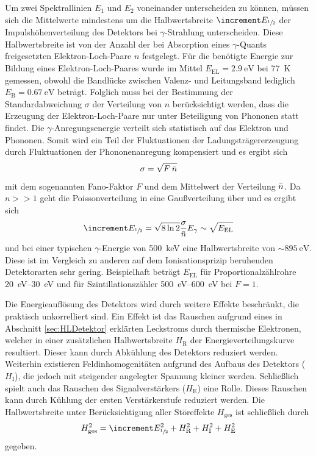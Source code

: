 Um zwei Spektrallinien $E_1$ und $E_2$ voneinander unterscheiden zu können, müssen
sich die Mittelwerte mindestens um die Halbwertsbreite $\increment E_{\sfrac{1}{2}}$
der Impulshöhenverteilung des Detektors bei $\gamma$-Strahlung unterscheiden.
Diese Halbwertsbreite ist von der Anzahl der bei Absorption eines $\gamma$-Quants
freigesetzten Elektron-Loch-Paare $n$ festgelegt.
Für die benötigte Energie zur Bildung eines Elektron-Loch-Paares wurde im Mittel
$E_\text{EL} = \SI{2.9}{\electronvolt}$ bei \SI{77}{\kelvin} gemessen,
obwohl die Bandlücke zwischen Valenz- und Leitungsband lediglich
$E_\text{B} = \SI{0.67}{\electronvolt}$ beträgt.
Folglich muss bei der Bestimmung der Standardabweichung $\sigma$ der Verteilung von $n$ berücksichtigt werden, dass die
Erzeugung der Elektron-Loch-Paare nur unter Beteiligung von Phononen statt findet.
Die $\gamma$-Anregungsenergie verteilt sich statistisch auf das Elektron und Phononen.
Somit wird ein Teil der Fluktuationen der Ladungsträgererzeugung durch Fluktuationen der
Phononenanregung kompensiert und es ergibt sich
\begin{equation}
	\sigma = \sqrt{F\:\bar{n}}
\end{equation}
mit dem sogenannten Fano-Faktor $F$ und dem Mittelwert der Verteilung $\bar{n}$.
Da $n >> 1$ geht die Poissonverteilung in eine Gaußverteilung über und es ergibt sich
\begin{equation}
	\increment E_{\sfrac{1}{2}} = \sqrt{8 \ln2} \frac{\sigma}{\mean{n}} E_\gamma
  \sim \sqrt{E_\text{EL}}
\end{equation}
und bei einer typischen $\gamma$-Energie von \SI{500}{\kilo\electronvolt} eine
Halbwertsbreite von $\sim \SI{895}{\electronvolt}$.
Diese ist im Vergleich zu anderen auf dem Ionisationsprizip beruhenden
Detektorarten sehr gering.
Beispielhaft beträgt $E_\text{EL}$ für Proportionalzählrohre
\SIrange[range-phrase=\text{ bis }]{20}{30}{\electronvolt} und für Szintillationszähler
\SIrange[range-phrase=\text{ bis }]{500}{600}{\electronvolt} bei $F = \num{1}$.

Die Energieauflösung des Detektors wird durch weitere Effekte beschränkt, die praktisch unkorrelliert sind.
Ein Effekt ist das Rauschen aufgrund eines in Abschnitt \ref{sec:HLDetektor} erklärten Leckstroms
durch thermische Elektronen, welcher in einer zusätzlichen Halbwertsbreite $H_\text{R}$ der Energieverteilungskurve resultiert.
Dieser kann durch Abkühlung des Detektors reduziert werden.
Weiterhin existieren Feldinhomogenitäten aufgrund des Aufbaus des Detektors ($H_\text{I}$), die jedoch
mit steigender angelegter Spannung kleiner werden.
Schließlich spielt auch das Rauschen des Signalverstärkers ($H_\text{E}$) eine Rolle. Dieses Rauschen
kann durch Kühlung der ersten Verstärkerstufe reduziert werden.
Die Halbwertsbreite unter Berücksichtigung aller Störeffekte $H_\text{ges}$
ist schließlich durch
\begin{equation}
  H_\text{ges}^2 = \increment E_{\sfrac{1}{2}}^2 + H_\text{R}^2
  + H_\text{I}^2 + H_\text{E}^2
\end{equation}
gegeben.

